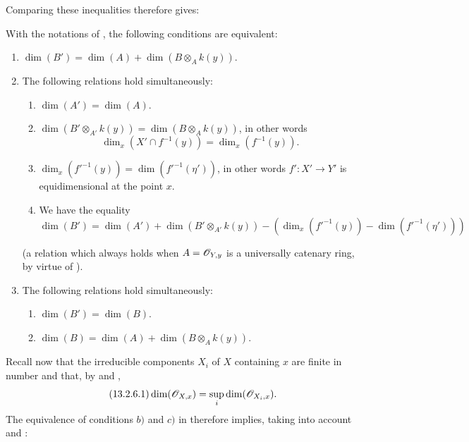 
Comparing these inequalities therefore gives:

\begin{lemma}[13.2.5]
\label{IV.13.2.5}
With the notations of , the following conditions are equivalent:
\begin{enumerate}[label=\emph{\alph*)}]
  \item $\dim(B')=\dim(A)+\dim(B\otimes_A k(y))$.
  \item The following relations hold simultaneously:
  \begin{enumerate}[label=(\roman*)]
    \item $\dim(A')=\dim(A)$.
    \item $\dim(B'\otimes_{A'}k(y))=\dim(B\otimes_A k(y))$, in other words
    \[
      \dim_x(X'\cap f^{-1}(y))=\dim_x(f^{-1}(y)).
    \]
    \item $\dim_x(f'^{-1}(y))=\dim(f'^{-1}(\eta'))$, in other words $f':X'\to Y'$ is equidimensional  at the point $x$.
    \item We have the equality
    \[
      \dim(B')=\dim(A')+\dim(B'\otimes_{A'}k(y))-(\dim_x(f'^{-1}(y))-\dim(f'^{-1}(\eta')))
    \]
  \end{enumerate}
  (a relation which always holds when $A=\mathscr{O}_{Y,y}$ is a universally catenary ring, by virtue of ).
  \item The following relations hold simultaneously:
  \begin{enumerate}[label=(\roman*)]
    \item $\dim(B')=\dim(B)$.
    \item $\dim(B)=\dim(A)+\dim(B\otimes_A k(y))$.
  \end{enumerate}
\end{enumerate}
\end{lemma}

\begin{env}[13.2.6]
\label{IV.13.2.6}
Recall now that the irreducible components $X_i$ of $X$ containing $x$ are finite in number and that, by  and ,
\[
\label{IV.13.2.6.1}
\tag{13.2.6.1}
  \dim(\mathscr{O}_{X,x})=\sup_i\dim(\mathscr{O}_{X_i,x}).
\]
The equivalence of conditions $b)$ and $c)$ in  therefore implies, taking into account  and :
\end{env}

